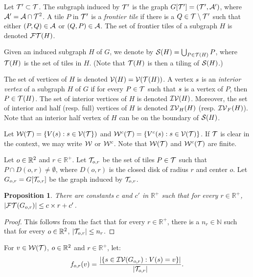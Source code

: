 \documentclass[11pt]{article}
\newtheorem{proposition}[theorem]{Proposition}
\theoremstyle{definition}
\begin{document}
%

Let $\mathcal{T}'\subset\mathcal{T}$. The subgraph induced by $\mathcal{T}'$ is the graph $G[\mathcal{T}']=(\mathcal{T}',\mathcal{A}')$, where $\mathcal{A}'=\mathcal{A} \cap \mathcal{T}^2$.
A tile $P$ in $\mathcal{T}'$ is a \emph{frontier tile} if there is a $Q\in\mathcal{T} \setminus \mathcal{T}'$ such that either $(P,Q)\in \mathcal{A}$ or $(Q,P)\in \mathcal{A}$. %
The set of frontier tiles of a subgraph $H$ is denoted $\mathcal{FT}(H)$.

%

Given an induced subgraph $H$ of $G$, we denote by $\mathcal{S}(H) = \bigcup_{P\in \mathcal{T}(H)} P$, where $\mathcal{T}(H)$ is the set of tiles in $H$. (Note that $\mathcal{T}(H)$ is then a tiling of $\mathcal{S}(H)$.)

The set of vertices of $H$ is denoted $\mathcal{V}(H)=\mathcal{V}(\mathcal{T}(H))$.
A vertex $s$ is an \emph{interior vertex} of a subgraph $H$ of $G$ if for every $P\in \mathcal{T}$ such that $s$ is a vertex of $P$, then $P\in \mathcal{T}(H)$.
The set of interior vertices of $H$ is denoted $\mathcal{IV}(H)$.
Moreover, the set of interior and half (resp. full) vertices of $H$ is denoted $\mathcal{IV}_H(H)$ (resp. $\mathcal{IV}_F(H)$).
Note that an interior half vertex of $H$ can be on the boundary of $\mathcal{S}(H)$.

Let $\mathcal{W}(\mathcal{T})=\{V(s) : s \in \mathcal{V}(\mathcal{T}\})$ and ${{\mathcal{W}}^c}(\mathcal{T})=\{{V^c}(s) : s \in \mathcal{V}(\mathcal{T})\}$. 
If $\mathcal{T}$ is clear in the context, we may write $\mathcal{W}$ or ${{\mathcal{W}}^c}$.
%
Note that $\mathcal{W}(\mathcal{T})$ and ${{\mathcal{W}}^c}(\mathcal{T})$ are finite.

%

Let $o\in \mathbb{R}^2$ and $r\in \mathbb{R}^+$.
Let $\mathcal{T}_{o,r}$ be the set of tiles $P\in \mathcal{T}$ such that $P\cap D(o,r) \ne \emptyset$, where $D(o,r)$ is the closed disk of radius $r$ and center $o$.
Let $G_{o,r}= G[\mathcal{T}_{o,r}]$ be the graph induced by $\mathcal{T}_{o,r}$.

\begin{proposition}\label{prop:o}
There are constants $c$ and $c'$ in $\mathbb{R}^+$ such that for every $r\in\mathbb{R}^+$, $|\mathcal{FT}(G_{o,r})| \le c \times r + c'$.  
\end{proposition}
\begin{proof}
This follows from the fact that for every $r\in \mathbb{R}^+$, there is a $n_r\in \mathbb{N}$ such that for every $o\in \mathbb{R}^2$, $\vert \mathcal{T}_{o,r} \vert \le n_r$.
\end{proof}

%

For $v\in \mathcal{W}(\mathcal{T})$, $o\in \mathbb{R}^2$ and $r\in\mathbb{R}^+$, let: $$f_{o,r}(v)=\frac{|\{ s\in \mathcal{IV}(G_{o,r}) : V(s) = v \}|}{|\mathcal{T}_{o,r}|}.$$
\end{document}
